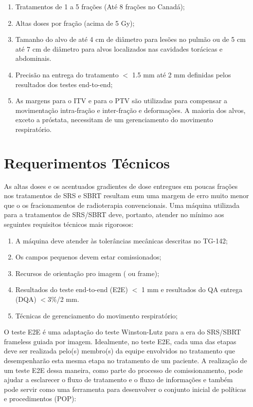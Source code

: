\documentclass[11pt,a4paper]{article}
\begin{document}
	\begin{enumerate}[label=\textcolor{CarnationPink}{(\roman*)}]
		\item Tratamentos de 1 a 5 frações (Até 8 frações no Canadá);
		\item Altas doses por fração (acima de 5 Gy);
		\item Tamanho do alvo de até 4 cm de diâmetro para lesões no pulmão ou de 5 cm até 7 cm de diâmetro para alvos localizados nas cavidades torácicas e abdominais.
		\item Precisão na entrega do tratamento $<$ 1.5 mm até 2 mm definidas pelos resultados dos testes end-to-end;
		\item As margens para o ITV e para o PTV são utilizadas para compensar a movimentação intra-fração e inter-fração e deformações. A maioria dos alvos, exceto a próstata, necessitam de um gerenciamento do movimento respiratório.
	\end{enumerate}

\section{Requerimentos Técnicos}

	As altas doses e os acentuados gradientes de dose entregues em poucas frações nos tratamentos de SRS e SBRT resultam eum uma margem de erro muito menor que o os fracionamentos de radioterapia convencionais. Uma máquina utilizada para a tratamentos de SRS/SBRT deve, portanto, atender no mínimo aos seguintes requisitos técnicos mais rigorosos:

	\begin{enumerate}[label=\textcolor{CarnationPink}{(\roman*)}]
		\item A máquina deve atender às tolerâncias mecânicas descritas no TG-142;
		\item Os campos pequenos devem estar comissionados;
		\item Recursos de orientação pro imagem ( ou frame);
		\item Resultados do teste end-to-end (E2E) $<$ 1 mm e resultados do QA entrega (DQA) $<$3\%/2 mm.
		\item Técnicas de gerenciamento do movimento respiratório;
	\end{enumerate}

	O teste E2E é uma adaptação do teste Winston-Lutz para a era do SRS/SBRT frameless guiada por imagem. Idealmente, no teste E2E, cada uma das etapas deve ser realizada pelo(s) membro(s) da equipe envolvidos no tratamento que desempenharão esta mesma etapa no tratamento de um paciente. A realização de um teste E2E dessa maneira, como parte do processo de comissionamento, pode ajudar a esclarecer o fluxo de tratamento e o fluxo de informações e também pode servir como uma ferramenta para desenvolver o conjunto inicial de políticas e procedimentos (POP):
\end{document}
